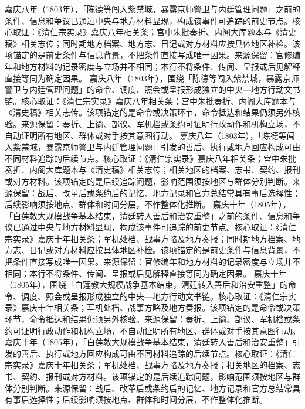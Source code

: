 嘉庆八年（1803年），「陈德等闯入紫禁城，暴露京师警卫与内廷管理问题」之前的条件、信息和争议已通过中央与地方材料显现，构成该事件可追踪的前史节点。核心取证：《清仁宗实录》嘉庆八年相关条；宫中朱批奏折、内阁大库题本与《清史稿》相关志传；同时期地方档案、地方志、日记或对方材料应按具体地区补检。该项锚定的是前史条件与信息背景，不把条件直接写成唯一因果。来源保留：官修编年和地方材料的记录密度与立场并不相同；本行不将条件、传闻、呈报或后见解释直接等同为确定因果。
嘉庆八年（1803年），围绕「陈德等闯入紫禁城，暴露京师警卫与内廷管理问题」的命令、调度、照会或呈报形成独立的中央—地方行动文书链。核心取证：《清仁宗实录》嘉庆八年相关条；宫中朱批奏折、内阁大库题本与《清史稿》相关志传。该项锚定的是命令或决策环节，命令抵达和结果仍须另外核验。来源保留：奏折、上谕、部议、军机档或条约可证明行政动作和机构立场，不自动证明所有地区、群体或对手按其意图行动。
嘉庆八年（1803年），「陈德等闯入紫禁城，暴露京师警卫与内廷管理问题」引发的善后、执行或地方回应构成可由不同材料追踪的后续节点。核心取证：《清仁宗实录》嘉庆八年相关条；宫中朱批奏折、内阁大库题本与《清史稿》相关志传；相关地区的档案、志书、契约、报刊或对方材料。该项锚定的是后续追踪问题，影响范围须按地区与群体分别判断。来源保留：战后、改革后或条约后的记忆、地方记录和官方总结常具有事后选择性；后续影响须按地点、群体和时间分层，不作整体化推断。
嘉庆十年（1805年），「白莲教大规模战争基本结束，清廷转入善后和治安重整」之前的条件、信息和争议已通过中央与地方材料显现，构成该事件可追踪的前史节点。核心取证：《清仁宗实录》嘉庆十年相关条；军机处档、战事方略及地方奏报；同时期地方档案、地方志、日记或对方材料应按具体地区补检。该项锚定的是前史条件与信息背景，不把条件直接写成唯一因果。来源保留：官修编年和地方材料的记录密度与立场并不相同；本行不将条件、传闻、呈报或后见解释直接等同为确定因果。
嘉庆十年（1805年），围绕「白莲教大规模战争基本结束，清廷转入善后和治安重整」的命令、调度、照会或呈报形成独立的中央—地方行动文书链。核心取证：《清仁宗实录》嘉庆十年相关条；军机处档、战事方略及地方奏报。该项锚定的是命令或决策环节，命令抵达和结果仍须另外核验。来源保留：奏折、上谕、部议、军机档或条约可证明行政动作和机构立场，不自动证明所有地区、群体或对手按其意图行动。
嘉庆十年（1805年），「白莲教大规模战争基本结束，清廷转入善后和治安重整」引发的善后、执行或地方回应构成可由不同材料追踪的后续节点。核心取证：《清仁宗实录》嘉庆十年相关条；军机处档、战事方略及地方奏报；相关地区的档案、志书、契约、报刊或对方材料。该项锚定的是后续追踪问题，影响范围须按地区与群体分别判断。来源保留：战后、改革后或条约后的记忆、地方记录和官方总结常具有事后选择性；后续影响须按地点、群体和时间分层，不作整体化推断。
